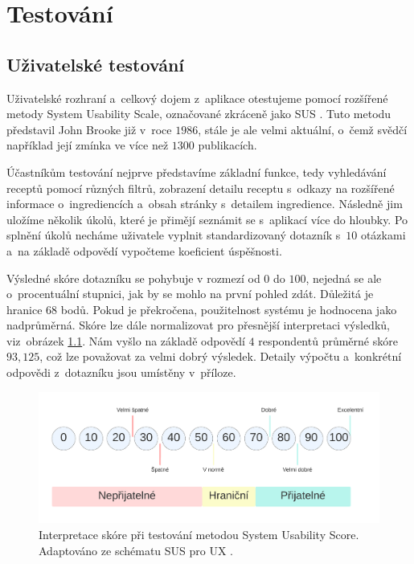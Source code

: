 \chapter{Testování}

\section{Uživatelské testování}

Uživatelské rozhraní a~celkový dojem z~aplikace otestujeme pomocí rozšířené metody System Usability Scale, označované zkráceně jako SUS \citep{sus-test}. Tuto metodu představil John Brooke již v~roce $1986$, stále je ale velmi aktuální, o~čemž svědčí například její zmínka ve více než $1300$ publikacích.

Účastníkům testování nejprve představíme základní funkce, tedy vyhledávání receptů pomocí různých filtrů, zobrazení detailu receptu s~odkazy na rozšířené informace o~ingrediencích a~obsah stránky s~detailem ingredience. Následně jim uložíme několik úkolů, které je přimějí seznámit se s~aplikací více do hloubky. Po splnění úkolů necháme uživatele vyplnit standardizovaný dotazník s~$10$ otázkami a~na základě odpovědí vypočteme koeficient úspěšnosti.

Výsledné skóre dotazníku se pohybuje v rozmezí od $0$ do $100$, nejedná se ale o~procentuální stupnici, jak by se mohlo na první pohled zdát. Důležitá je hranice $68$ bodů. Pokud je překročena, použitelnost systému je hodnocena jako nadprůměrná. Skóre lze dále normalizovat pro přesnější interpretaci výsledků, viz~obrázek \ref{obr04:sus-score-system}. Nám vyšlo na základě odpovědí $4$ respondentů průměrné skóre $93,125$, což lze považovat za velmi dobrý výsledek. Detaily výpočtu a~konkrétní odpovědi z~dotazníku jsou umístěny v~příloze.

\begin{figure}[h!]\centering
\includegraphics[width=140mm]{../img/sus-score-system}
\caption{Interpretace skóre při testování metodou System Usability Score. Adaptováno ze schématu SUS pro UX \citep{sus-adobe}.}
\label{obr04:sus-score-system}
\end{figure}

